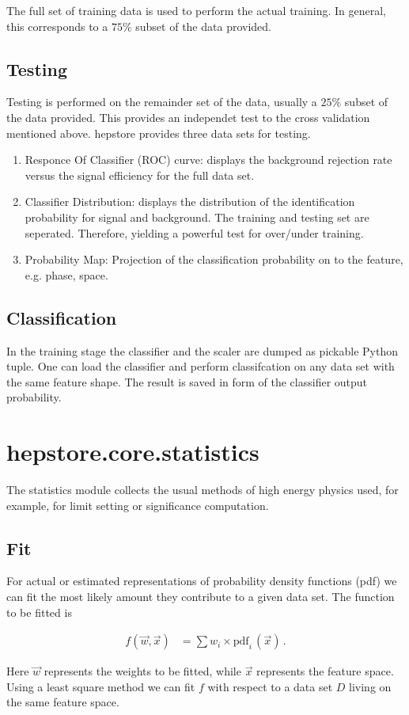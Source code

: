 The full set of training data is used to perform the actual
training. In general, this corresponds to a $75\%$ subset of the data
provided.

\subsection{Testing}

Testing is performed on the remainder set of the data, usually a
$25\%$ subset of the data provided. This provides an independet test
to the cross validation mentioned above. hepstore provides three data
sets for testing.
%
\begin{enumerate}
\item Responce Of Classifier (ROC) curve: displays the background
  rejection rate versus the signal efficiency for the full data set.
\item Classifier Distribution: displays the distribution of the
  identification probability for signal and background. The training
  and testing set are seperated. Therefore, yielding a powerful test
  for over/under training.
\item Probability Map: Projection of the classification probability on
  to the feature, e.g. phase, space.
\end{enumerate}
%

\subsection{Classification}

In the training stage the classifier and the scaler are dumped as
pickable Python tuple. One can load the classifier and perform
classifcation on any data set with the same feature shape. The result
is saved in form of the classifier output probability.

\section{hepstore.core.statistics}

The statistics module collects the usual methods of high energy
physics used, for example, for limit setting or significance
computation.

\subsection{Fit}

For actual or estimated representations of probability density
functions (pdf) we can fit the most likely amount they contribute to a
given data set. The function to be fitted is
%
\begin{ceqn}
  \begin{align}
     f\left(\vec{w},\vec{x}\right) &= \sum w_i \times \text{pdf}_i\,\left(\vec{x}\right)\,.
  \end{align}
\end{ceqn}
%
Here $\vec{w}$ represents the weights to be fitted, while $\vec{x}$
represents the feature space. Using a least square method we can fit
$f$ with respect to a data set $D$ living on the same feature space.

